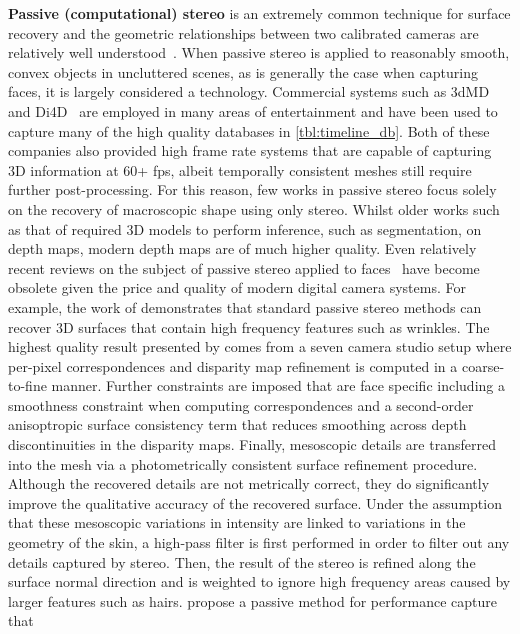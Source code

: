 \textbf{Passive (computational) stereo} is an extremely common technique for
surface recovery and the geometric relationships between two calibrated cameras
are relatively well
understood~\cite{barnard1982computational,seitz2006comparison}. When passive
stereo is applied to reasonably smooth, convex objects in uncluttered scenes, as
is generally the case when capturing faces, it is largely considered a
technology. Commercial systems such as 3dMD~\cite{3dmd} and Di4D~\cite{di4d} are
employed in many areas of entertainment and have been used to capture many of
the high quality databases in \cref{tbl:timeline_db}. Both of these companies
also provided high frame rate systems that are capable of capturing 3D
information at 60+ fps, albeit temporally consistent meshes still require
further post-processing. For this reason, few works in passive stereo focus
solely on the recovery of macroscopic shape using only stereo. Whilst older
works such as that of \citet{Lengagne:1996ej} required 3D models to perform
inference, such as segmentation, on depth maps, modern depth maps are of much
higher quality. Even relatively recent reviews on the subject of passive stereo
applied to faces~\cite{Leclercq:2005ee} have become obsolete given the price and
quality of modern digital camera systems. For example, the work of
\citet{Beeler:2010dg} demonstrates that standard passive stereo methods can
recover 3D surfaces that contain high frequency features such as wrinkles.
The highest quality result presented by \citet{Beeler:2010dg} comes from a seven
camera studio setup where per-pixel correspondences and disparity map refinement
is computed in a coarse-to-fine manner. Further constraints are imposed that are
face specific including a smoothness constraint when computing correspondences
and a second-order anisoptropic surface consistency term that reduces smoothing
across depth discontinuities in the disparity maps. Finally, mesoscopic details
are transferred into the mesh via a photometrically consistent surface
refinement procedure. Although the recovered details are not metrically correct,
they do significantly improve the qualitative accuracy of the recovered surface.
Under the assumption that these mesoscopic variations in intensity are linked to
variations in the geometry of the skin, a high-pass filter is first performed in
order to filter out any details captured by stereo. Then, the result of the
stereo is refined along the surface normal direction and is weighted to ignore
high frequency areas caused by larger features such as hairs.
\citet{bradley2010high} propose a passive method for performance capture that
